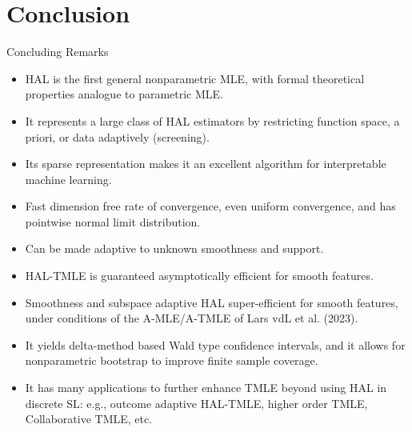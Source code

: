 \documentclass[t]{beamer}
\newlength{\wideitemsep}
\let\olditem\item
\renewcommand{\item}{\setlength{\itemsep}{\wideitemsep}\olditem}
\begin{document}
\section{Conclusion}
\begin{frame}{Concluding Remarks}
\begin{itemize}
    \item HAL is the first general nonparametric MLE, with formal theoretical properties analogue to parametric MLE.
      \item It represents a large class of HAL estimators by restricting function space, a priori, or data adaptively (screening).
    \item Its sparse representation makes it an excellent algorithm for interpretable machine learning.
    \item Fast dimension free rate of convergence, even uniform convergence, and has pointwise normal limit distribution.
    \item Can be made adaptive to unknown smoothness and support.
    \item HAL-TMLE is guaranteed asymptotically efficient for smooth features.
    \end{itemize}
    \end{frame}
    \begin{frame}
    \begin{itemize}
    \item Smoothness and subspace adaptive HAL super-efficient for smooth features, under conditions of the A-MLE/A-TMLE of Lars vdL et al. (2023).
     \item It yields delta-method based Wald type confidence intervals, and it allows for nonparametric bootstrap to improve finite sample coverage.
    \item It has many applications to further enhance TMLE beyond using HAL in discrete SL: e.g., outcome adaptive HAL-TMLE, higher order TMLE, Collaborative TMLE, etc.
\end{itemize}
\end{frame}


\end{document}
